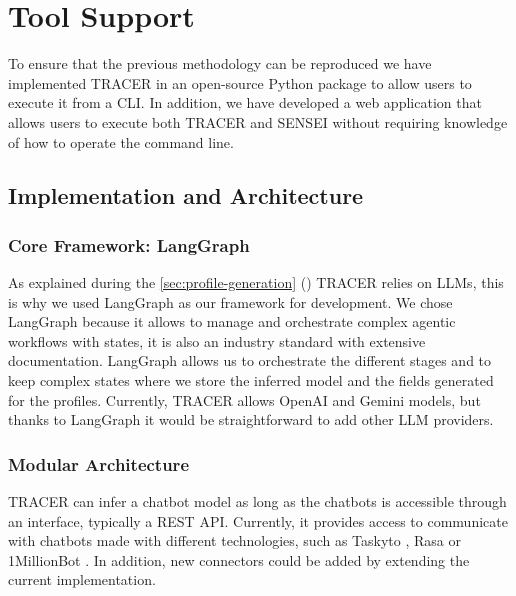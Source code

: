 
\chapter{Tool Support}\label{chapter:tool_support}

To ensure that the previous methodology can be reproduced
we have implemented \acf{TRACER} in an open-source Python package
to allow users to execute it from a \ac{CLI}.
In addition, we have developed a web application
that allows users to execute both \ac{TRACER} and SENSEI
without requiring knowledge of how to operate the command line.


\section{Implementation and Architecture}

\subsection{Core Framework: LangGraph}

As explained during the \autoref{sec:profile-generation} ()
\ac{TRACER} relies on \acp{LLM},
this is why we used LangGraph \autocite{LangGraph} as our framework for development.
We chose LangGraph because
it allows to manage and orchestrate
complex agentic workflows with states,
it is also an industry standard with extensive documentation.
LangGraph allows us to orchestrate the different stages
and to keep complex states where we store
the inferred model and the fields generated for the profiles.
Currently, \ac{TRACER} allows OpenAI and Gemini models,
but thanks to LangGraph it would be straightforward to add other \ac{LLM} providers.

\subsection{Modular Architecture}

\ac{TRACER} can infer a chatbot model as long as
the chatbots is accessible through an interface, typically a \acs{REST} \acs{API}.
Currently, it provides access to communicate with chatbots made with different technologies,
such as Taskyto \autocite{sanchezcuadradoAutomatingDevelopmentTaskoriented2024}, Rasa \autocite{Rasa2020} or 1MillionBot \autocite{1MillionBot}.
In addition, new connectors could be added by extending the current implementation.

